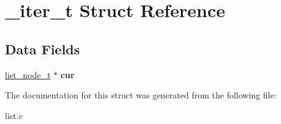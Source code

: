 \hypertarget{struct__iter__t}{}\section{\+\_\+iter\+\_\+t Struct Reference}
\label{struct__iter__t}
\subsection*{Data Fields}
\begin{DoxyCompactItemize}
\item 
\hypertarget{struct__iter__t_a72d6d40690cb02f3a9bc8f11589599e9}{}\hyperlink{struct__list__node__t}{list\+\_\+node\+\_\+t} $\ast$ {\bfseries cur}\label{struct__iter__t_a72d6d40690cb02f3a9bc8f11589599e9}

\end{DoxyCompactItemize}


The documentation for this struct was generated from the following file\+:\begin{DoxyCompactItemize}
\item 
list.\+c\end{DoxyCompactItemize}
